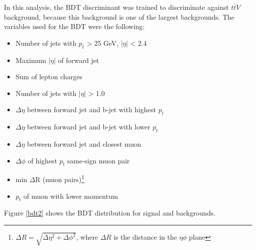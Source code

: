 In this analysis, the BDT discriminant was trained to discriminate against $t\bar{t}V$ background, because this background is one of the largest backgrounds. The variables used for the BDT were the following:

\begin{itemize}
\item Number of jets with $p_t$ > 25 GeV, $|\eta|$ < 2.4
\item Maximum $|\eta|$ of forward jet
\item Sum of lepton charges
\item Number of jets with $|\eta|$ > 1.0
\item $\Delta\eta$ between forward jet and b-jet with highest $p_t$
\item $\Delta\eta$ between forward jet and b-jet with lower $p_t$
\item $\Delta\eta$ between forward jet and closest muon
\item $\Delta\phi$ of highest $p_t$ same-sign muon pair
\item min $\Delta$R (muon pairs)\footnote{$\Delta R = \sqrt{ \Delta\eta^2 + \Delta\phi^2}$, where $\Delta R$ is the distance in the $\eta \phi$ plane}
\item $p_t$ of muon with lower momentum
\end{itemize}

Figure \ref{bdt2} shows the BDT distribution for signal and backgrounds.
\pagebreak




